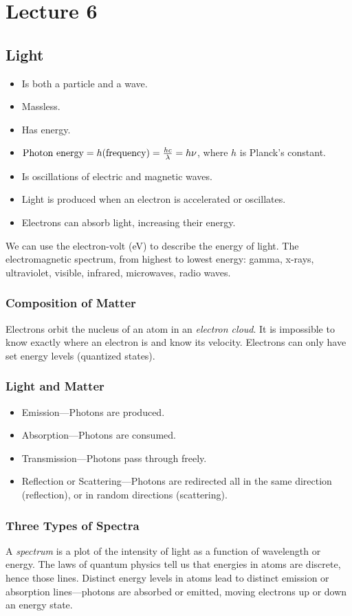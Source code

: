 \documentclass[class=article, crop=false]{standalone}
\begin{document}
  \section{Lecture 6}
  \subsection{Light}
  \begin{itemize}
    \item Is both a particle and a wave.
    \item Massless.
    \item Has energy.
    \item $\text{Photon energy} = h (\text{frequency}) = \frac{hc}{\lambda} = h\nu$, where $h$ is Planck's constant.
    \item Is oscillations of electric and magnetic waves.
    \item Light is produced when an electron is accelerated or oscillates.
    \item Electrons can absorb light, increasing their energy.
  \end{itemize}
  We can use the electron-volt (eV) to describe the energy of light. The electromagnetic spectrum, from highest to lowest energy: gamma, x-rays, ultraviolet, visible, infrared, microwaves, radio waves.
  \subsubsection{Composition of Matter}
  Electrons orbit the nucleus of an atom in an \emph{electron cloud}. It is impossible to know exactly where an electron is and know its velocity. Electrons can only have set energy levels (quantized states).
  \subsubsection{Light and Matter}
  \begin{itemize}
    \item Emission---Photons are produced.
    \item Absorption---Photons are consumed.
    \item Transmission---Photons pass through freely.
    \item Reflection or Scattering---Photons are redirected all in the same direction (reflection), or in random directions (scattering).
  \end{itemize}
  \subsubsection{Three Types of Spectra}
  A \emph{spectrum} is a plot of the intensity of light as a function of wavelength or energy. The laws of quantum physics tell us that energies in atoms are discrete, hence those lines. Distinct energy levels in atoms lead to distinct emission or absorption lines---photons are absorbed or emitted, moving electrons up or down an energy state.
\end{document}
